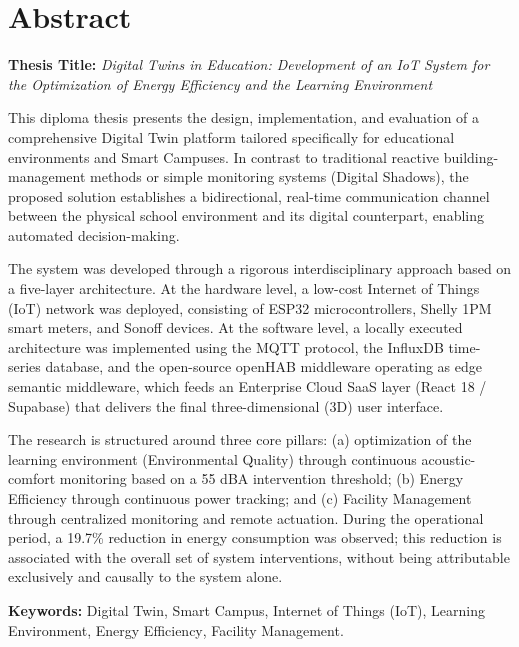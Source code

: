 \clearpage
{}
\chapter*{Abstract}

\noindent\textbf{Thesis Title:} \textit{Digital Twins in Education: Development of an IoT System for the Optimization of Energy Efficiency and the Learning Environment}

This diploma thesis presents the design, implementation, and evaluation of a comprehensive \textlatin{Digital Twin} platform tailored specifically for educational environments and \textlatin{Smart Campuses}. In contrast to traditional reactive building-management methods or simple monitoring systems (\textlatin{Digital Shadows}), the proposed solution establishes a bidirectional, real-time communication channel between the physical school environment and its digital counterpart, enabling automated decision-making.

The system was developed through a rigorous interdisciplinary approach based on a five-layer architecture. At the hardware level, a low-cost \textlatin{Internet of Things} (\textlatin{IoT}) network was deployed, consisting of ESP32 microcontrollers, Shelly 1PM smart meters, and Sonoff devices. At the software level, a locally executed architecture was implemented using the MQTT protocol, the InfluxDB time-series database, and the open-source openHAB middleware operating as edge semantic middleware, which feeds an Enterprise Cloud SaaS layer (React 18 / Supabase) that delivers the final three-dimensional (3D) user interface.

The research is structured around three core pillars: (\textlatin{a}) optimization of the learning environment (\textlatin{Environmental Quality}) through continuous acoustic-comfort monitoring based on a 55 dBA intervention threshold; (\textlatin{b}) \textlatin{Energy Efficiency} through continuous power tracking; and (\textlatin{c}) \textlatin{Facility Management} through centralized monitoring and remote actuation. During the operational period, a 19.7\% reduction in energy consumption was observed; this reduction is associated with the overall set of system interventions, without being attributable exclusively and causally to the system alone.

\noindent\textbf{Keywords:} \textlatin{Digital Twin}, \textlatin{Smart Campus}, \textlatin{Internet of Things} (\textlatin{IoT}), Learning Environment, \textlatin{Energy Efficiency}, \textlatin{Facility Management}.
\clearpage
